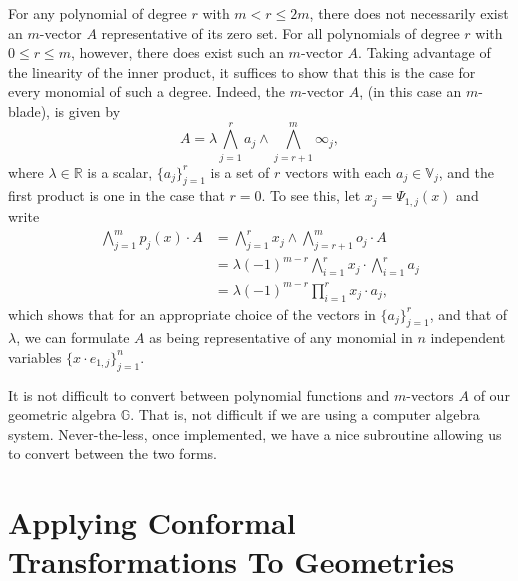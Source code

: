\documentclass{ecgd-l}
\theoremstyle{definition}
\theoremstyle{remark}
\numberwithin{equation}{section}
\newcommand{\G}{\mathbb{G}}
\newcommand{\V}{\mathbb{V}}
\newcommand{\R}{\mathbb{R}}
\newcommand{\nvai}{\infty}
\newcommand{\nvao}{o}
\begin{document}
For any polynomial of degree $r$ with $m<r\leq 2m$, there does not necessarily exist an $m$-vector
$A$ representative of its zero set.  For all polynomials of degree $r$ with $0\leq r\leq m$, however,
there does exist such an $m$-vector $A$.  Taking advantage of the linearity of the inner product,
it suffices to show that this is the case for every monomial of such a degree.  Indeed, the $m$-vector
$A$, (in this case an $m$-blade), is given by
\begin{equation*}
A = \lambda\bigwedge_{j=1}^r a_j\wedge\bigwedge_{j=r+1}^m\nvai_j,
\end{equation*}
where $\lambda\in\R$ is a scalar, $\{a_j\}_{j=1}^r$ is a set of $r$ vectors with
each $a_j\in\V_j$,
and the first product is one in the case that $r=0$.
To see this, let $x_j=\Psi_{1,j}(x)$ and write
\begin{align*}
\bigwedge_{j=1}^m p_j(x)\cdot A &= \bigwedge_{j=1}^r x_j\wedge\bigwedge_{j=r+1}^m\nvao_j\cdot A \\
 &= \lambda(-1)^{m-r}\bigwedge_{i=1}^r x_j \cdot\bigwedge_{i=1}^r a_j \\
 &= \lambda(-1)^{m-r}\prod_{i=1}^r x_j\cdot a_j,
\end{align*}
which shows that for an appropriate choice of the vectors in $\{a_j\}_{j=1}^r$,
and that of $\lambda$, we can formulate $A$ as being representative of any monomial in $n$
independent variables $\{x\cdot e_{1,j}\}_{j=1}^n$.

It is not difficult to convert between polynomial functions and $m$-vectors $A$
of our geometric algebra $\G$.  That is, not difficult if we are using a computer
algebra system.  Never-the-less, once implemented, we have a nice subroutine
allowing us to convert between the two forms.

\section{Applying Conformal Transformations To Geometries}
\end{document}
